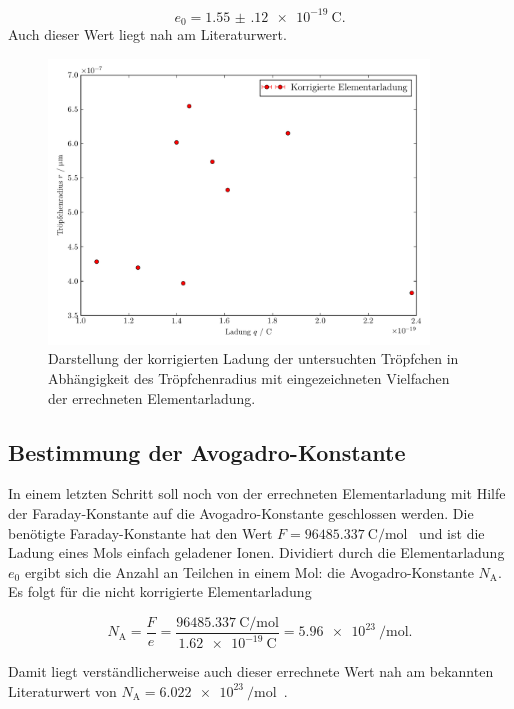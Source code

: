 \documentclass[
  bibliography=totoc,     %
  captions=tableheading,  %
  titlepage=firstiscover, %
]{scrartcl}
\begin{document}
\begin{equation}
    e_0 = \SI{1.55(12)e-19}{\coulomb}.
\end{equation}
Auch dieser Wert liegt nah am Literaturwert.
\begin{figure}[h]
    \centering
    \includegraphics[width=0.9\textwidth]{plot_messwerte+.pdf}
    \caption{Darstellung der korrigierten Ladung der untersuchten Tröpfchen in Abhängigkeit des Tröpfchenradius mit eingezeichneten Vielfachen der errechneten Elementarladung.}
    \label{fig:messwerte+}
\end{figure}

\subsection{Bestimmung der Avogadro-Konstante}

In einem letzten Schritt soll noch von der errechneten Elementarladung mit Hilfe der Faraday-Konstante auf die Avogadro-Konstante geschlossen werden. Die benötigte Faraday-Konstante hat den Wert $F=\SI{96485.337}{\coulomb\per\mol}$~\cite{faraday} und ist die Ladung eines Mols einfach geladener Ionen. Dividiert durch die Elementarladung $e_0$ ergibt sich die Anzahl an Teilchen in einem Mol: die Avogadro-Konstante $N_{\mathup{A}}$. Es folgt für die nicht korrigierte Elementarladung

\begin{equation}
    N_{\mathup{A}}=\frac{F}{e}=\frac{\SI{96485.337}{\coulomb\per\mol}}{\SI{1.62e-19}{\coulomb}}=\SI{5.96e23}{\per\mol}.
\end{equation}

Damit liegt verständlicherweise auch dieser errechnete Wert nah am bekannten Literaturwert von $N_{\mathup{A}}=\SI{6.022e23}{\per\mol}$~\cite{avogadro}.
\end{document}
